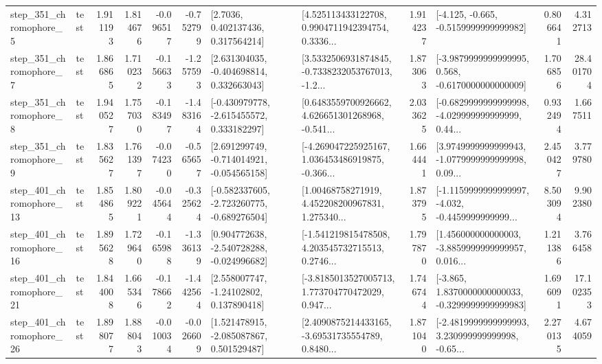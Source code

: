 \begin{tabular}{llrrrrllrlrr}
   step\_351\_chromophore\_5 &      test &      1.911193 &    1.814676 &     -0.096517 & -0.752799 &          [2.7036, 0.402137436, 0.317564214] &  [4.525113433122708, 0.9904711942394754, 0.3336... &       1.914237 &              [-4.125, -0.665, -0.5159999999999982] &            0.806641 &          4.312713 \\
   step\_351\_chromophore\_7 &      test &      1.866865 &    1.710232 &     -0.156633 & -1.257593 &    [2.631304035, -0.404698814, 0.332663043] &  [3.5332506931874845, -0.7338232053767013, -1.2... &       1.873063 &  [-3.9879999999999995, 0.568, -0.6170000000000009] &            1.706856 &         28.401704 \\
   step\_351\_chromophore\_8 &      test &      1.940527 &    1.757030 &     -0.183497 & -1.483164 &   [-0.430979778, -2.615455572, 0.333182297] &  [0.6483559700926662, 4.626651301268968, -0.541... &       2.033625 &  [-0.6829999999999998, -4.029999999999999, 0.44... &            0.932494 &          1.667511 \\
   step\_351\_chromophore\_9 &      test &      1.835627 &    1.761397 &     -0.074230 & -0.565657 &   [2.691299749, -0.714014921, -0.054565158] &  [-4.269047225925167, 1.036453486919875, -0.366... &       1.664441 &  [3.9749999999999943, -1.0779999999999998, 0.09... &            2.450427 &          3.779780 \\
  step\_401\_chromophore\_13 &      test &      1.854865 &    1.809221 &     -0.045644 & -0.325624 &  [-0.582337605, -2.723260775, -0.689276504] &  [1.00468758271919, 4.452208200967831, 1.275340... &       1.873795 &  [-1.1159999999999997, -4.032, -0.4459999999999... &            8.503094 &          9.902380 \\
  step\_401\_chromophore\_16 &      test &      1.895628 &    1.729640 &     -0.165988 & -1.336139 &   [0.904772638, -2.540728288, -0.024996682] &  [-1.541219815478508, 4.203545732715513, 0.2746... &       1.797870 &  [1.456000000000003, -3.8859999999999957, 0.016... &            1.211386 &          3.766458 \\
  step\_401\_chromophore\_21 &      test &      1.844008 &    1.665346 &     -0.178662 & -1.442564 &     [2.558007747, -1.24102802, 0.137890418] &  [-3.8185013527005713, 1.773704770472029, 0.947... &       1.746744 &  [-3.865, 1.8370000000000033, -0.3299999999999983] &            1.696091 &         17.102353 \\
  step\_401\_chromophore\_26 &      test &      1.898077 &    1.888043 &     -0.010034 & -0.026609 &    [1.521478915, -2.085087867, 0.501529487] &  [2.4090875214433165, -3.69531735554789, 0.8480... &       1.871040 &  [-2.4819999999999993, 3.230999999999998, -0.65... &            2.270135 &          4.674059 \\

\end{tabular}
